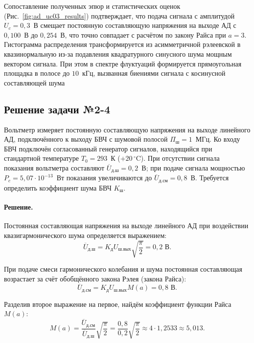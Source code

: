 Сопоставление полученных эпюр и статистических оценок (Рис.~\ref{fig:ad_uc03_results}) подтверждает, что подача сигнала с амплитудой $U_c = 0{,}3$~В смещает постоянную составляющую напряжения на выходе АД с $0{,}100$~В до $0{,}254$~В, что точно совпадает с расчётом по закону Райса при $a = 3$. Гистограмма распределения трансформируется из асимметричной рэлеевской в квазинормальную из-за подавления квадратурного синусного шума мощным вектором сигнала. При этом в спектре флуктуаций формируется прямоугольная площадка в полосе до $10$~кГц, вызванная биениями сигнала с косинусной составляющей шума
\subsection{Решение задачи №2-4}

Вольтметр измеряет постоянную составляющую напряжения на выходе линейного АД, подключённого к выходу БВЧ с шумовой полосой $\Pi_{\text{ш}} = 1$~МГц. Ко входу БВЧ подключён согласованный генератор сигналов, находящийся при стандартной температуре $T_0 = 293$~К ($+20\,^{\circ}\text{C}$). При отсутствии сигнала показания вольтметра составляют $\overline{U}_{\text{д.ш}} = 0{,}2$~В; при подаче сигнала мощностью $P_c = 5{,}07 \cdot 10^{-13}$~Вт показания увеличиваются до $\overline{U}_{\text{д.см}} = 0{,}8$~В.
Требуется определить коэффициент шума БВЧ $K_{\text{ш}}$.

\paragraph{Решение.}
Постоянная составляющая напряжения на выходе линейного АД при воздействии квазигармонического шума определяется выражением:
\begin{equation}
    \overline{U}_{\text{д.ш}} = K_{\text{д}} U_{\text{ш.вых}} \sqrt{\frac{\pi}{2}} = 0{,}2\text{ В}.
\end{equation}

При подаче смеси гармонического колебания и шума постоянная составляющая возрастает за счёт обобщённого закона Рэлея (закона Райса):
\begin{equation}
    \overline{U}_{\text{д.см}} = K_{\text{д}} U_{\text{ш.вых}} M(a) = 0{,}8\text{ В}.
\end{equation}

Разделив второе выражение на первое, найдём коэффициент функции Райса $M(a)$:
\begin{equation}
    M(a) = \frac{\overline{U}_{\text{д.см}}}{\overline{U}_{\text{д.ш}}} \sqrt{\frac{\pi}{2}} = \frac{0{,}8}{0{,}2} \sqrt{\frac{\pi}{2}} \approx 4 \cdot 1{,}2533 \approx 5{,}013.
\end{equation}

